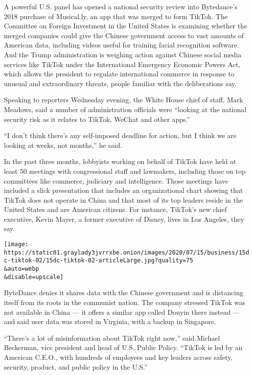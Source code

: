 A powerful U.S. panel has opened a national security review into
Bytedance's 2018 purchase of Musical.ly, an app that was merged to form
TikTok. The Committee on Foreign Investment in the United States is
examining whether the merged companies could give the Chinese government
access to vast amounts of American data, including videos useful for
training facial recognition software. And the Trump administration is
weighing action against Chinese social media services like TikTok under
the International Emergency Economic Powers Act, which allows the
president to regulate international commerce in response to unusual and
extraordinary threats, people familiar with the deliberations say.

Speaking to reporters Wednesday evening, the White House chief of staff,
Mark Meadows, said a number of administration officials were ``looking
at the national security risk as it relates to TikTok, WeChat and other
apps.''

``I don't think there's any self-imposed deadline for action, but I
think we are looking at weeks, not months,'' he said.

In the past three months, lobbyists working on behalf of TikTok have
held at least 50 meetings with congressional staff and lawmakers,
including those on top committees like commerce, judiciary and
intelligence. Those meetings have included a slick presentation that
includes an organizational chart showing that TikTok does not operate in
China and that most of its top leaders reside in the United States and
are American citizens. For instance, TikTok's new chief executive, Kevin
Mayer, a former executive of Disney, lives in Los Angeles, they say.

\texttt{[image: https://static01.graylady3jvrrxbe.onion/images/2020/07/15/business/15dc-tiktok-02/15dc-tiktok-02-articleLarge.jpg?quality=75\\\&auto=webp\\\&disable=upscale]}

ByteDance denies it shares data with the Chinese government and is
distancing itself from its roots in the communist nation. The company
stressed TikTok was not available in China --- it offers a similar app
called Douyin there instead --- and said user data was stored in
Virginia, with a backup in Singapore.

``There's a lot of misinformation about TikTok right now,'' said Michael
Beckerman, vice president and head of U.S. Public Policy. ``TikTok is
led by an American C.E.O., with hundreds of employees and key leaders
across safety, security, product, and public policy in the U.S.''

